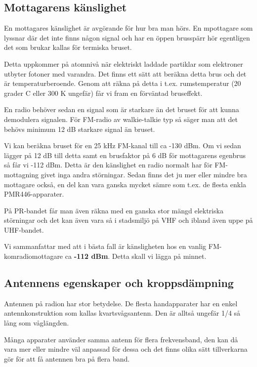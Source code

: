 \subsection{Mottagarens känslighet}

En mottagares känslighet är avgörande för hur bra man hörs. En mpottagare som lyssnar där det inte finns någon signal och har en öppen brusspärr hör egentligen det som brukar kallas för termiska bruset.

Detta uppkommer på atomnivå när elektriskt laddade partiklar som elektroner utbyter fotoner med varandra. Det finns ett sätt att beräkna detta brus och det är temperaturberoende. Genom att räkna på detta i t.ex. rumstemperatur (20 grader C eller 300 K ungefär) får vi fram en förväntad bruseffekt.

En radio behöver sedan en signal som är starkare än det bruset för att kunna demodulera signalen. För FM-radio av walkie-talkie typ så säger man att det behövs minimum 12 dB starkare signal än bruset.

Vi kan beräkna bruset för en 25 kHz FM-kanal till ca -130 dBm. Om vi sedan lägger på 12 dB till detta samt en brusfaktor på 6 dB för mottagarens egenbrus så får vi -112 dBm. Detta är den känslighet en radio normalt har för FM-mottagning givet inga andra störningar. Sedan finns det ju mer eller mindre bra mottagare också, en del kan vara ganska mycket sämre som t.ex. de flesta enkla PMR446-apparater.

På PR-bandet får man även räkna med en ganska stor mängd elektriska störningar och det kan även vara så i stadsmiljö på VHF och ibland även uppe på UHF-bandet.

Vi sammanfattar med att i bästa fall är känsligheten hos en vanlig FM-komradiomottagare ca \textbf{-112 dBm}. Detta skall vi lägga på minnet.

\subsection{Antennens egenskaper och kroppsdämpning}

Antennen på radion har stor betydelse. De flesta handapparater har en enkel antennkonstruktion som kallas kvartsvågsantenn. Den är alltså ungefär 1/4 så lång som våglängden. 

Många apparater använder samma antenn för flera frekvensband, den kan då vara mer eller mindre väl anpassad för dessa och det finns olika sätt tillverkarna gör för att få antennen bra på flera band.

